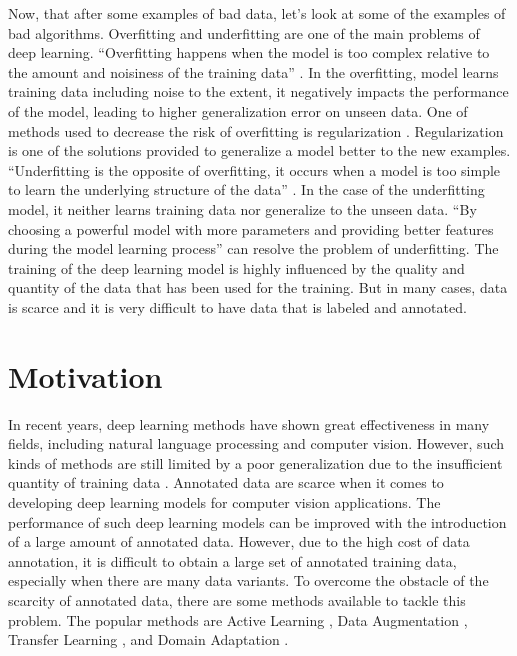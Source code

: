 Now, that after some examples of bad data, let's look at some of the examples of bad algorithms. Overfitting and underfitting are one of the main problems of deep learning. ``Overfitting happens when the model is too complex relative to the amount and noisiness of the training data'' \cite{10.5555/3153997}. In the overfitting, model learns training data including noise to the extent, it negatively impacts the performance of the model, leading to higher generalization error on unseen data. One of methods used to decrease the risk of overfitting is regularization \cite{kukacka2017regularization}. Regularization is one of the solutions provided to generalize a model better to the new examples. ``Underfitting is the opposite of overfitting, it occurs when a model is too simple to learn the underlying structure of the data'' \cite{10.5555/3153997}. In the case of the underfitting model, it neither learns training data nor generalize to the unseen data. ``By choosing a powerful model with more parameters and providing better features during the model learning process'' \cite{10.5555/3153997} can resolve the problem of underfitting. The training of the deep learning model is highly influenced by the quality and quantity of the data that has been used for the training. But in many cases, data is scarce and it is very difficult to have data that is labeled and annotated. 





\section{Motivation}\label{motivation}

In recent years, deep learning methods have shown great effectiveness in many fields, including natural language processing and computer vision. However, such kinds of methods are still limited by a poor generalization due to the insufficient quantity of training data \cite{8978087}. Annotated data are scarce when it comes to developing deep learning models for computer vision applications. The performance of such deep learning models can be improved with the introduction of a large amount of annotated data. However, due to the high cost of data annotation, it is difficult to obtain a large set of annotated training data, especially when there are many data variants. To overcome the obstacle of the scarcity of annotated data, there are some methods available to tackle this problem. The popular methods are Active Learning \cite{hemmer2020deal}, Data Augmentation \cite{Shorten.2019}, Transfer Learning \cite{zhuang2020comprehensive}, and Domain Adaptation \cite{redko2020survey}. 

